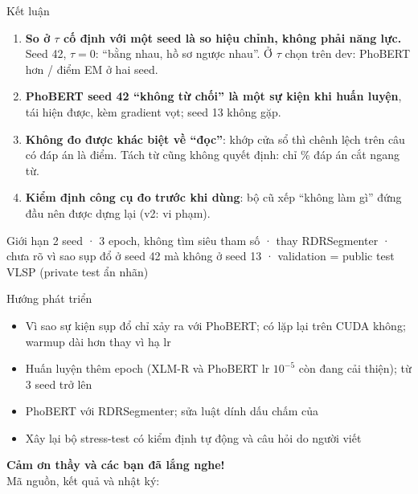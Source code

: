 \begin{frame}{Kết luận}
\footnotesize
\begin{enumerate}\setlength{\itemsep}{0pt}\setlength{\topsep}{0pt}
\item \textbf{So ở $\tau$ cố định với một seed là so hiệu chỉnh, không phải năng lực.} Seed 42, $\tau = 0$: ``bằng nhau, hồ sơ ngược nhau''. Ở $\tau$ chọn trên dev: PhoBERT hơn \PairTDiff{} / \PairSTDiff{} điểm EM ở hai seed.
\item \textbf{PhoBERT seed 42 ``không từ chối'' là một sự kiện khi huấn luyện}, tái hiện được, kèm gradient vọt; seed 13 không gặp.
\item \textbf{Không đo được khác biệt về ``đọc''}: khớp cửa sổ thì chênh lệch trên câu có đáp án là \PairMAnsDiff{} điểm. Tách từ cũng không quyết định: chỉ \SegMisPct\% đáp án cắt ngang từ.
\item \textbf{Kiểm định công cụ đo trước khi dùng}: bộ cũ xếp ``không làm gì'' đứng đầu nên được dựng lại (v2: \StressViol{} vi phạm).
\end{enumerate}

\vspace{0.1em}
\begin{block}{Giới hạn}
\footnotesize 2 seed · 3 epoch, không tìm siêu tham số ·  thay RDRSegmenter · chưa rõ vì sao sụp đổ ở seed 42 mà không ở seed 13 · validation = public test VLSP (private test ẩn nhãn)
\end{block}
\end{frame}

\begin{frame}{Hướng phát triển}
\small
\begin{itemize}
\item Vì sao sự kiện sụp đổ chỉ xảy ra với PhoBERT; có lặp lại trên CUDA không; warmup dài hơn thay vì hạ lr
\item Huấn luyện thêm epoch (XLM-R và PhoBERT lr $10^{-5}$ còn đang cải thiện); từ 3 seed trở lên
\item PhoBERT với RDRSegmenter; sửa luật dính dấu chấm của 
\item Xây lại bộ stress-test có kiểm định tự động và câu hỏi do người viết
\end{itemize}

\vspace{1em}
\centering
{\headfont\bfseries\Large Cảm ơn thầy và các bạn đã lắng nghe!}\\[4pt]
\footnotesize Mã nguồn, kết quả và nhật ký: 
\end{frame}

